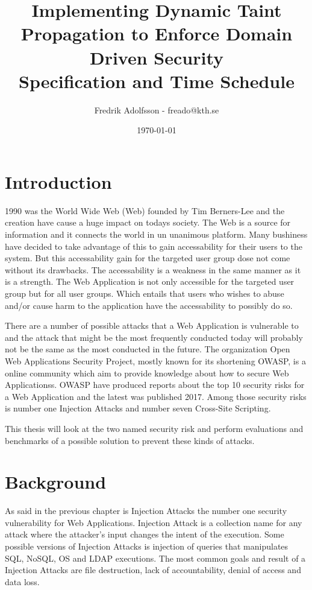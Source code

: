 \documentclass{../kththesis}
\title{Implementing Dynamic Taint Propagation to Enforce Domain Driven Security \\
        \large Specification and Time Schedule}
\author{Fredrik Adolfsson - freado@kth.se}
\date{\today}
\begin{document}
\frontmatter


\titlepage


\tableofcontents


\mainmatter



\chapter{Introduction}
1990 was the World Wide Web (Web) founded by Tim Berners-Lee and the creation have cause a huge impact on todays society. \parencite{www} The Web is a source for information and it connects the world in un unanimous platform. Many bushiness have decided to take advantage of this to gain accessability for their users to the system. But this accessability gain for the targeted user group dose not come without its drawbacks. The accessability is a weakness in the same manner as it is a strength. The Web Application is not only accessible for the targeted user group but for all user groups. Which entails that users who wishes to abuse and/or cause harm to the application have the accessability to possibly do so. 

There are a number of possible attacks that a Web Application is vulnerable to and the attack that might be the most frequently conducted today will probably not be the same as the most conducted in the future. The organization Open Web Applications Security Project, mostly known for its shortening OWASP, is a online community which aim to provide knowledge about how to secure Web Applicationss. \parencite{OpenWebApplicationSecurityProject} OWASP have produced reports about the top 10 security risks for a Web Application and the latest was published 2017. Among those security risks is number one Injection Attacks and number seven Cross-Site Scripting. \parencite{OWASP2017, OpenWebApplicationSecurityProject, CrossMichael2007Dgtw}

This thesis will look at the two named security risk and perform evaluations and benchmarks of a possible solution to prevent these kinds of attacks. 



\chapter{Background}
As said in the previous chapter is Injection Attacks the number one security vulnerability for Web Applications. Injection Attack is a collection name for any attack where the attacker's input changes the intent of the execution. Some possible versions of Injection Attacks is injection of queries that manipulates SQL, NoSQL, OS and LDAP executions. \parencite{OWASP2017} The most common goals and result of a Injection Attacks are file destruction, lack of accountability, denial of access and data loss. \parencite{Secure_Web}
\end{document}
